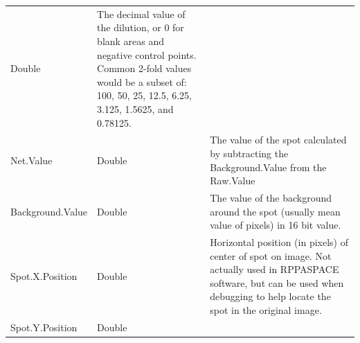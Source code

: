 \documentclass[
]{article}
\begin{document}
\begin{longtable}[]{@{}lll@{}}
\begin{minipage}[t]{0.26\columnwidth}
Double\strut
\end{minipage} & \begin{minipage}[t]{0.40\columnwidth}\raggedright
The decimal value of the dilution, or 0 for blank areas and negative
control points. Common 2-fold values would be a subset of: 100, 50, 25,
12.5, 6.25, 3.125, 1.5625, and 0.78125.\strut
\end{minipage}\tabularnewline
\begin{minipage}[t]{0.26\columnwidth}\raggedright
Net.Value\strut
\end{minipage} & \begin{minipage}[t]{0.26\columnwidth}\raggedright
Double\strut
\end{minipage} & \begin{minipage}[t]{0.40\columnwidth}\raggedright
The value of the spot calculated by subtracting the Background.Value
from the Raw.Value\strut
\end{minipage}\tabularnewline
\begin{minipage}[t]{0.26\columnwidth}\raggedright
Background.Value\strut
\end{minipage} & \begin{minipage}[t]{0.26\columnwidth}\raggedright
Double\strut
\end{minipage} & \begin{minipage}[t]{0.40\columnwidth}\raggedright
The value of the background around the spot (usually mean value of
pixels) in 16 bit value.\strut
\end{minipage}\tabularnewline
\begin{minipage}[t]{0.26\columnwidth}\raggedright
Spot.X.Position\strut
\end{minipage} & \begin{minipage}[t]{0.26\columnwidth}\raggedright
Double\strut
\end{minipage} & \begin{minipage}[t]{0.40\columnwidth}\raggedright
Horizontal position (in pixels) of center of spot on image. Not actually
used in RPPASPACE software, but can be used when debugging to help
locate the spot in the original image.\strut
\end{minipage}\tabularnewline
\begin{minipage}[t]{0.26\columnwidth}\raggedright
Spot.Y.Position\strut
\end{minipage} & \begin{minipage}[t]{0.26\columnwidth}\raggedright
Double\strut
\end{minipage} & \begin{minipage}[t]{0.40\columnwidth}\raggedright

\end{minipage}
\end{longtable}
\end{document}
